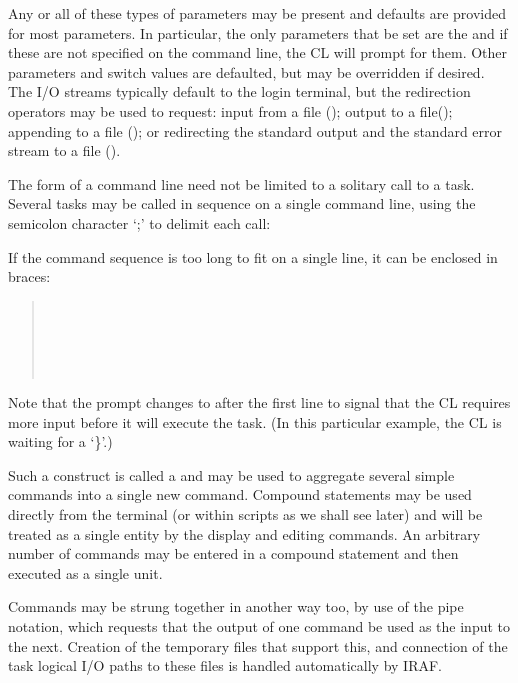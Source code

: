 \noindent
Any or all of these types of parameters may be present 
and defaults are provided for most parameters.  
In particular, the only parameters that 
 be set are the 
and if these are not specified on the command line, the CL will prompt
for them.  Other parameters and switch values are defaulted, but may be
overridden if desired. 
The I/O streams typically default to the login terminal, but the
redirection operators may be used to request: input from a file
(\usertype{$<$}); output to a file(\usertype{$>$}); appending to
a file (\usertype{$>>$}); or redirecting the standard output and the 
standard error stream to a file (\usertype{$>$\&}). 

The form of a command line need not be limited to a solitary call to a task.
Several tasks may be called in sequence on a single command 
line, using the semicolon character `;' to delimit each call:

\begin{quotation}\noindent
{} 
\end{quotation}

\newpage
\noindent
If the command sequence is too long to fit on a single line, it can be
enclosed in braces:

\begin{quotation}\noindent
{} \usertype{\{ } \\
\comptype{>>>}  \\
\comptype{>>>}  \\
\comptype{>>>}  \\
\comptype{>>>} \usertype{\} }
\end{quotation}

\noindent
Note that the prompt changes to \comptype{>>>} after the first
line to signal that the CL requires more input before it will execute the
task. (In this particular example, the CL is waiting for a `\}'.)

Such a construct is called a  and may be
used to aggregate several simple commands into a single new command.
Compound statements may be used directly from the terminal (or within
scripts as we shall see later) and will be treated as a single 
entity by the display and editing commands.
An arbitrary number of commands may be entered in a compound statement
and then executed as a single unit.  

Commands may be strung together in another way too, by use of the
pipe notation, which requests that the output of one command
be used as the input to the next.  Creation of the temporary files that
support this, and connection of the task logical I/O paths to these
files is handled automatically by IRAF.


